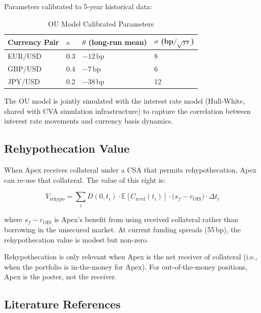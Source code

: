 \documentclass[11pt,a4paper]{article}
\begin{document}
Parameters calibrated to 5-year historical data:

\begin{table}[h!]
\centering
\caption{OU Model Calibrated Parameters}
\begin{tabular}{@{}llll@{}}
\toprule
\textbf{Currency Pair} & \textbf{$\kappa$} & \textbf{$\theta$ (long-run mean)} & \textbf{$\sigma$ (bp$/\!\sqrt{\mathrm{yr}}$)} \\
\midrule
EUR/USD & 0.3 & $-12\,\mathrm{bp}$ & 8  \\
GBP/USD & 0.4 & $-7\,\mathrm{bp}$  & 6  \\
JPY/USD & 0.2 & $-38\,\mathrm{bp}$ & 12 \\
\bottomrule
\end{tabular}
\end{table}

The OU model is jointly simulated with the interest rate model (Hull-White, shared with CVA
simulation infrastructure) to capture the correlation between interest rate movements and
currency basis dynamics.

\subsection{Rehypothecation Value}

When Apex receives collateral under a CSA that permits rehypothecation, Apex can re-use that
collateral. The value of this right is:

\begin{equation}
V_{\mathrm{rehypo}} = \sum_i D(0,t_i)\cdot\mathbb{E}\!\left[C_{\mathrm{rcvd}}(t_i)\right]
\cdot \bigl(s_f - r_{\mathrm{OIS}}\bigr)\cdot\Delta t_i
\tag{6}
\end{equation}

where $s_f - r_{\mathrm{OIS}}$ is Apex's benefit from using received collateral rather than
borrowing in the unsecured market. At current funding spreads (55\,bp), the rehypothecation
value is modest but non-zero.

Rehypothecation is only relevant when Apex is the net receiver of collateral (i.e., when the
portfolio is in-the-money for Apex). For out-of-the-money positions, Apex is the poster, not
the receiver.

\subsection{Literature References}
\end{document}
